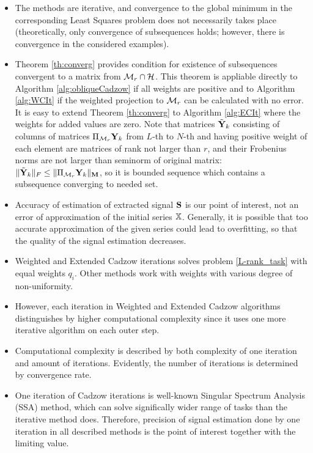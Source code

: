 \documentclass[12pt,a4paper,fleqn,leqno]{article}
\begin{document}
\begin{itemize}
\item
The methods are iterative, and convergence to the global minimum in the corresponding Least Squares problem does not necessarily takes place (theoretically, only convergence of subsequences holds; however, there is convergence in the considered examples). %
\item
Theorem \ref{th:converg} provides condition for existence of subsequences convergent to a matrix from $\mathcal{M}_r \cap \mathcal{H}$. This theorem is appliable directly to Algorithm \ref{alg:obliqueCadzow} if all weights are positive and to Algorithm \ref{alg:WCIt} if the weighted projection to $\mathcal{M}_r$ can be calculated with no error. It is easy to extend Theorem \ref{th:converg} to Algorithm \ref{alg:ECIt} where the weights for added values are zero. Note that matrices $\tilde {\mathbf{Y}}_k$ consisting of columns of matrices $\Pi_{\mathcal{M}_r} \mathbf{Y}_k$ from $L$-th to $N$-th and having positive weight of each element are matrices of rank not larger than $r$, and their Frobenius norms are not larger than seminorm of original matrix: $\|\tilde {\mathbf{Y}}_k\|_F \le \|\Pi_{\mathcal{M}_r} \mathbf{Y}_k\|_{\mathbf{M}}$, so it is bounded sequence which contains a subsequence converging to needed set.
\item
Accuracy of estimation of extracted signal $\mathbf{S}$ is our point of interest, not an error of approximation of the initial series $\mathbb{X}$. Generally, it is possible that too accurate approximation of the given series could lead to overfitting, so that the quality of the signal estimation decreases.
\item
Weighted and Extended Cadzow iterations solves problem \eqref{L-rank_task} with equal weights $q_i$. Other methods work with weights with various degree of non-uniformity.
\item
However, each iteration in Weighted and Extended Cadzow algorithms distinguishes by higher computational complexity since it uses one more iterative algorithm on each outer step.
\item
Computational complexity is described by both complexity of one iteration and amount of iterations. Evidently, the number of iterations is determined by convergence rate.
\item
One iteration of Cadzow iterations is well-known Singular Spectrum Analysis (SSA) method, which can solve significally wider range of tasks than the iterative method does. Therefore, precision of signal estimation done by one iteration in all described methods is the point of interest together with the limiting value.

\end{itemize}
\end{document}
